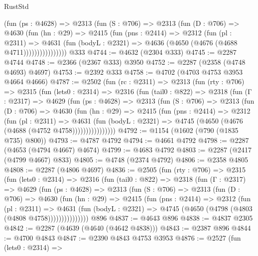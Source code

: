 \begin{lexlean}{RustStd}
\begin{coremodule}
                (fun (ps : @4628) =>
                @2313
                  (fun (S : @706) =>
                  @2313
                    (fun (D : @706) =>
                    @4630
                      (fun (hn : @29) =>
                      @2415
                        (fun (pns : @2414) =>
                        @2312
                          (fun (pl : @2311) =>
                          @4631
                            (fun (bodyL : @2321) => @4636 (@4650 (@4676 (@4688 @4711))))))))))))))))
    @333
@4744 := @4632 (@2304 @333)
@4745 := @2287 @4744
@4748 := @2366 (@2367 @333) @3950
@4752 := @2287 (@2358 (@4748 @4693) @4697)
@4753 := @2392 @333
@4758 := @4702 (@4703 @4753 @3953 @4664 @4666)
@4787 := @2502
    (fun (rc : @2311) =>
    @2313
      (fun (rty : @706) =>
      @2315
        (fun (lets0 : @2314) =>
        @2316
          (fun (tail0 : @822) =>
          @2318
            (fun (Γ : @2317) =>
            @4629
              (fun (ps : @4628) =>
              @2313
                (fun (S : @706) =>
                @2313
                  (fun (D : @706) =>
                  @4630
                    (fun (hn : @29) =>
                    @2415
                      (fun (pns : @2414) =>
                      @2312
                        (fun (pl : @2311) =>
                        @4631
                          (fun (bodyL : @2321) =>
                          @4745 (@4650 (@4676 (@4688 (@4752 @4758))))))))))))))))
@4792 := @1154 (@1602 (@790 (@1835 @735) @800))
@4793 := @4787 @4792
@4794 := @4661 @4792
@4798 := @2287 (@4653 (@4794 @4667) @4674)
@4799 := @4683 @4792
@4803 := @2287 (@2417 (@4799 @4667) @833)
@4805 := @4748 (@2374 @4792)
@4806 := @2358 @4805
@4808 := @2287 (@4806 @4697)
@4836 := @2505
    (fun (rty : @706) =>
    @2315
      (fun (lets0 : @2314) =>
      @2316
        (fun (tail0 : @822) =>
        @2318
          (fun (Γ : @2317) =>
          @4629
            (fun (ps : @4628) =>
            @2313
              (fun (S : @706) =>
              @2313
                (fun (D : @706) =>
                @4630
                  (fun (hn : @29) =>
                  @2415
                    (fun (pns : @2414) =>
                    @2312
                      (fun (pl : @2311) =>
                      @4631
                        (fun (bodyL : @2321) =>
                        @4745 (@4650 (@4798 (@4803 (@4808 @4758)))))))))))))))
    @896
@4837 := @4643 @896
@4838 := @4837 @2305
@4842 := @2287 (@4639 (@4640 (@4642 @4838)))
@4843 := @2387 @896
@4844 := @4700 @4843
@4847 := @2390 @4843 @4753 @3953
@4876 := @2527
    (fun (lets0 : @2314) =>

\end{coremodule}
\end{lexlean}
